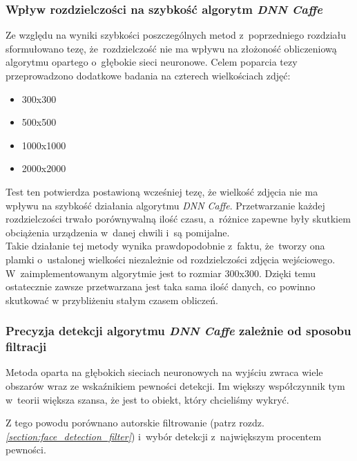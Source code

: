 \subsubsection{Wpływ rozdzielczości na szybkość algorytm \textit{DNN Caffe}} \label{section:test_dnn_resolution_speed}

Ze względu na wyniki szybkości poszczególnych metod z~poprzedniego rozdziału sformułowano tezę, że~rozdzielczość nie ma wpływu na złożoność obliczeniową algorytmu opartego o~głębokie sieci neuronowe. Celem poparcia tezy przeprowadzono dodatkowe badania na czterech wielkościach zdjęć: 

\begin{itemize}
    \item 300x300
    \item 500x500
    \item 1000x1000
    \item 2000x2000
\end{itemize}



Test ten potwierdza postawioną wcześniej tezę, że wielkość zdjęcia nie ma wpływu na szybkość działania algorytmu \textit{DNN Caffe}. Przetwarzanie każdej rozdzielczości trwało porównywalną ilość czasu, a~różnice zapewne były skutkiem obciążenia urządzenia w~danej chwili i~są pomijalne.\\

Takie działanie tej metody wynika prawdopodobnie z~faktu, że~tworzy ona plamki o~ustalonej wielkości niezależnie od rozdzielczości zdjęcia wejściowego. W~zaimplementowanym algorytmie jest to rozmiar 300x300. Dzięki temu ostatecznie zawsze przetwarzana jest taka sama ilość danych, co powinno skutkować w przybliżeniu stałym czasem obliczeń.




\subsubsection{Precyzja detekcji algorytmu \textit{DNN Caffe} zależnie od sposobu filtracji}

Metoda oparta na głębokich sieciach neuronowych na wyjściu zwraca wiele obszarów wraz ze wskaźnikiem pewności detekcji. Im większy współczynnik tym w~teorii większa szansa, że jest to obiekt, który chcieliśmy wykryć.

\par

Z tego powodu porównano autorskie filtrowanie (patrz rozdz. \hyperref[{section:face_detection_filter}]{\textit{\ref{section:face_detection_filter}}}) i~wybór detekcji z~największym procentem pewności.

